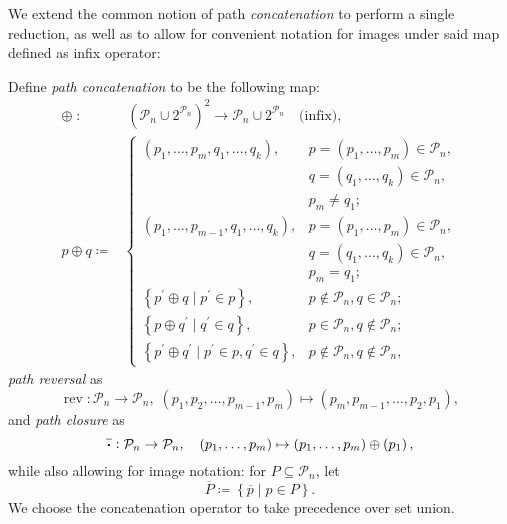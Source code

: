 \documentclass[index=totoc,bibliography=totoc]{scrartcl}
\newcommand*{\Cdot}{\raisebox{-0.30ex}{\scalebox{1.5}{$\cdot$}}}
\numberwithin{equation}{section}
\numberwithin{figure}{section}
\numberwithin{table}{section}
\let\defstyle\itshape
\begin{document}
We extend the common notion of path {\defstyle concatenation}
to perform a single reduction, as well as to allow for convenient notation for
images under said map defined as infix operator:
\begin{define}
\label{def:pathop}
  Define {\defstyle path concatenation} to be the following map:
  \[
    \begin{split}
    \oplus \; : & \; {\left( \mathcal{P}_n \cup 2^{\mathcal{P}_n} \right)}^2 \to
                       \mathcal{P}_n \cup 2^{\mathcal{P}_n} \quad \text{(infix)},
    \\
    p \oplus q \coloneqq &
    \begin{cases}
      \left(p_1,\ldots,p_m,q_1,\ldots,q_k\right),
      & p = \left(p_1,\ldots,p_m\right) \in \mathcal{P}_n, \\
      & q = \left(q_1,\ldots,q_k\right) \in \mathcal{P}_n, \\
      & p_m \neq q_1;
      \\
      \left(p_1,\ldots,p_{m-1},q_1,\ldots,q_k\right),
      & p = \left(p_1,\ldots,p_m\right) \in \mathcal{P}_n, \\
      & q = \left(q_1,\ldots,q_k\right) \in \mathcal{P}_n, \\
      & p_m = q_1;
      \\
      \left\{p^\prime \oplus q \; \vert \; p^\prime \in p\right\},
      & p \notin \mathcal{P}_n, q \in \mathcal{P}_n;
      \\
      \left\{p \oplus q^\prime \; \vert \; q^\prime \in q\right\},
      & p \in \mathcal{P}_n, q \notin \mathcal{P}_n;
      \\
      \left\{p^\prime \oplus q^\prime \; \vert \; p^\prime \in p, q^\prime \in q\right\},
      & p \notin \mathcal{P}_n, q \notin \mathcal{P}_n,
    \end{cases}
    \end{split}
  \]
  {\defstyle path reversal} as
  \[
    \operatorname{rev} : \mathcal{P}_n \to \mathcal{P}_n, \;
    \left(p_1,p_2,\ldots,p_{m-1},p_m\right) \mapsto \left(p_m,p_{m-1},\ldots,p_2,p_1\right),
  \]
  and {\defstyle path closure} as
  \[
    \overline{\Cdot} : \mathcal{P}_n \to \mathcal{P}_n,
    \quad \left(p_1,\ldots,p_m\right) \mapsto
    \left(p_1,\ldots,p_m\right) \oplus \left(p_1\right),
  \]
  while also allowing for image notation:
  for $P \subseteq \mathcal{P}_n$, let
  \[
    \overline{P} \coloneqq \left\{\overline{p} \mid p \in P\right\}.
  \]
  We choose the concatenation operator to take precedence over set union.
\end{define}
\end{document}
